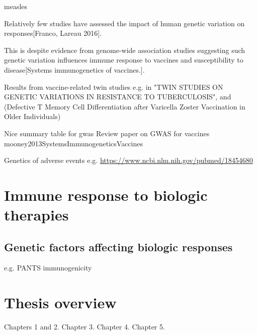 
measles

Relatively few studies have assessed the impact of human genetic variation on responses[Franco, Lareau 2016].

This is despite evidence from genome-wide association studies suggesting such genetic variation influences immune response to vaccines and susceptibility to disease[Systems immunogenetics of vaccines.].

Results from vaccine-related twin studies e.g. in "TWIN STUDIES ON GENETIC VARIATIONS IN RESISTANCE TO TUBERCULOSIS", and (Defective T Memory Cell Differentiation after Varicella Zoster Vaccination in Older Individuals)

Nice summary table for gwas 
Review paper on GWAS for vaccines mooney2013SystemsImmunogeneticsVaccines

Genetics of adverse events e.g. \url{https://www.ncbi.nlm.nih.gov/pubmed/18454680}

\section{Immune response to biologic therapies}

\subsection{Genetic factors affecting biologic responses}

e.g. PANTS immunogenicity

\section{Thesis overview}

Chapters 1 and 2.
Chapter 3.
Chapter 4.
Chapter 5.
